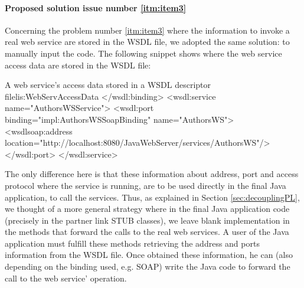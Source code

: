 \paragraph{Proposed solution issue number \ref{itm:item3}}
Concerning the problem number \ref{itm:item3} where the information to invoke a real web service are stored in the WSDL file, we adopted the same solution: to manually input the code. The following snippet shows where the web service access data are stored in the WSDL file:
  
\begin{workflow-code}{A web service's access data stored in a WSDL descriptor file}{lis:WebServAccessData}
 </wsdl:binding>
   <wsdl:service name="AuthorsWSService">
      <wsdl:port binding="impl:AuthorsWSSoapBinding" name="AuthorsWS">
         <wsdlsoap:address location="http://localhost:8080/JavaWebServer/services/AuthorsWS"/>
      </wsdl:port>
   </wsdl:service>	
\end{workflow-code}
  
The only difference here is that these information about address, port and access protocol where the service is running, are to be used directly in the final Java application, to call the services. Thus, as explained in Section \ref{sec:decouplingPL}, we thought of a more general strategy where in the final Java application code (precisely in the partner link STUB classes), we leave blank implementation in the methods that forward the calls to the real web services. A user of the Java application must fulfill these methods retrieving the address and ports information from the WSDL file. Once obtained these information, he can (also depending on the binding used, e.g. SOAP) write the Java code to forward the call to the web service' operation.

  
